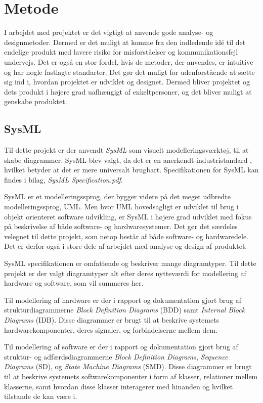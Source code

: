 \chapter{Metode}
I arbejdet med projektet er det vigtigt at anvende gode analyse- og designmetoder. Dermed er det muligt at komme fra den indledende idé til det endelige produkt med lavere risiko for misforståelser og kommunikationsfejl undervejs. Det er også en stor fordel, hvis de metoder, der anvendes, er intuitive og har nogle fastlagte standarter. Det gør det muligt for udenforstående at sætte sig ind i, hvordan projektet er udviklet og designet. Dermed bliver projektet og dets produkt i højere grad uafhængigt af enkeltpersoner, og det bliver muligt at genskabe produktet.

\section{SysML}
Til dette projekt er der anvendt \textit{SysML} som visuelt modelleringsværktøj, til at skabe diagrammer. SysML blev valgt, da det er en anerkendt industristandard\cite{website:SysML} , hvilket betyder at det er mere universalt brugbart. Specifikationen for SysML kan findes i bilag, \textit{SysML Specification.pdf}.

SysML er et modelleringssprog, der bygger videre på det meget udbredte modelleringssprog, UML. Men hvor UML hovedsagligt er udviklet til brug i objekt orienteret software udvikling, er SysML i højere grad udviklet med fokus på beskrivelse af både software- og hardwaresystemer. Det gør det særdeles velegnet til dette projekt, som netop består af både software- og hardwaredele. Det er derfor også i store dele af arbejdet med analyse og design af produktet.

SysML specifikationen er omfattende og beskriver mange diagramtyper. Til dette projekt er der valgt diagramtyper alt efter deres nytteværdi for modellering af hardware og software, som vil summeres her.

Til modellering af hardware er der i rapport og dokumentation gjort brug af strukturdiagrammerne \textit{Block Definition Diagrams} (BDD) samt \textit{Internal Block Diagrams} (IDB). Disse diagrammer er brugt til at beskrive systemets hardwarekomponenter, deres signaler, og forbindelserne mellem dem.

Til modellering af software er der i rapport og dokumentation gjort brug af struktur- og adfærdsdiagrammerne \textit{Block Definition Diagrams}, \textit{Sequence Diagrams} (SD), og \textit{State Machine Diagrams} (SMD). Disse diagrammer er brugt til at beskrive systemets softwarekomponenter i form af klasser, relationer mellem klasserne, samt hvordan disse klasser interagerer med hinanden og hvilket tilstande de kan være i.